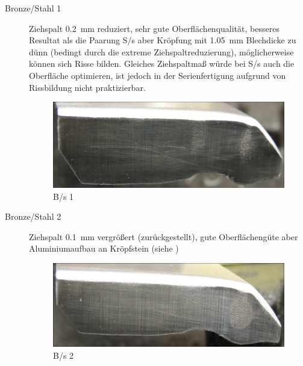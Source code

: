 \documentclass[12pt,a4paper,parskip,twoside,BCOR5mm,headsepline]{scrartcl}
\begin{document}
\begin{description*}
\begin{description}
\item[Bronze/Stahl 1] Ziehspalt \SI{0.2}{\milli\meter} reduziert, sehr gute Oberflächenqualität, besseres Resultat als die Paarung  S/s aber Kröpfung mit \SI{1.05}{\milli\meter} Blechdicke zu dünn (bedingt durch die extreme Ziehspaltreduzierung),  möglicherweise können sich Risse bilden. Gleiches Ziehspaltmaß würde bei S/s auch die Oberfläche optimieren, ist  jedoch in der Serienfertigung aufgrund von Rissbildung nicht praktizierbar.
\begin{figure}[H]
\centering
\includegraphics[width=.8\textwidth]{Bs1a}
\caption{B/s 1}
\label{fig:Bs1a}
\end{figure}

\item[Bronze/Stahl 2] Ziehspalt \SI{0.1}{\milli\meter} vergrößert (zurückgestellt), gute Oberflächengüte aber Aluminiumaufbau an Kröpfstein (siehe )
\begin{figure}[H]
\centering
\includegraphics[width=.8\textwidth]{Bs2}
\caption{B/s 2}
\label{fig:Bs2}
\end{figure}


\end{description}
\end{description*}
\end{document}
